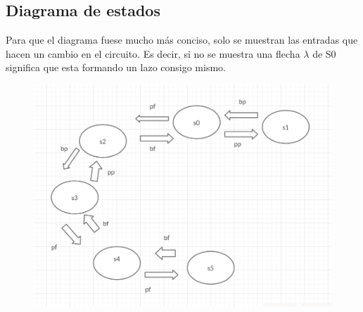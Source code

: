 \documentclass{article}
\begin{document}
\subsection{Diagrama de estados}
Para que el diagrama fuese mucho más conciso, solo se muestran las entradas que hacen un cambio en el circuito. Es decir, si no se muestra una flecha $\lambda$ de S0 significa que esta formando un lazo consigo mismo.
\begin{figure}[!h]
    \centering
    \includegraphics[scale=0.5]{diagrama.PNG}
\end{figure}
\end{document}
